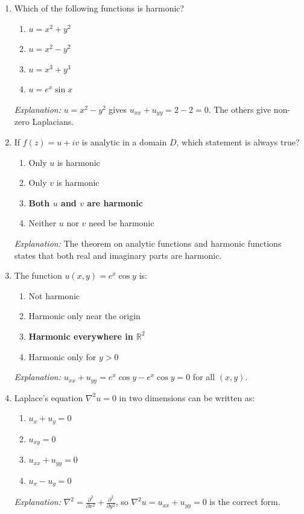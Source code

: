 \documentclass[12pt,a4paper]{article}
\begin{document}
\begin{enumerate}

\item Which of the following functions is harmonic?
\begin{enumerate}[label=(\alph*)]
  \item $u=x^{2}+y^{2}$
  \item \textbf{$u=x^{2}-y^{2}$}
  \item $u=x^{3}+y^{3}$
  \item $u=e^{x}\sin x$
\end{enumerate}
\textit{Explanation:} $u=x^{2}-y^{2}$ gives $u_{xx}+u_{yy}=2-2=0$. The others give non-zero
Laplacians.

\item If $f(z)=u+iv$ is analytic in a domain $D$, which statement is always true?
\begin{enumerate}[label=(\alph*)]
  \item Only $u$ is harmonic
  \item Only $v$ is harmonic
  \item \textbf{Both $u$ and $v$ are harmonic}
  \item Neither $u$ nor $v$ need be harmonic
\end{enumerate}
\textit{Explanation:} The theorem on analytic functions and harmonic functions states that both
real and imaginary parts are harmonic.

\item The function $u(x,y)=e^{x}\cos y$ is:
\begin{enumerate}[label=(\alph*)]
  \item Not harmonic
  \item Harmonic only near the origin
  \item \textbf{Harmonic everywhere in $\mathbb{R}^{2}$}
  \item Harmonic only for $y>0$
\end{enumerate}
\textit{Explanation:} $u_{xx}+u_{yy}=e^{x}\cos y - e^{x}\cos y = 0$ for all $(x,y)$.

\item Laplace's equation $\nabla^{2}u=0$ in two dimensions can be written as:
\begin{enumerate}[label=(\alph*)]
  \item $u_{x}+u_{y}=0$
  \item $u_{xy}=0$
  \item \textbf{$u_{xx}+u_{yy}=0$}
  \item $u_{x}-u_{y}=0$
\end{enumerate}
\textit{Explanation:} $\nabla^{2}=\frac{\partial^{2}}{\partial x^{2}}+\frac{\partial^{2}}{\partial y^{2}}$,
so $\nabla^{2}u=u_{xx}+u_{yy}=0$ is the correct form.


\end{enumerate}
\end{document}
